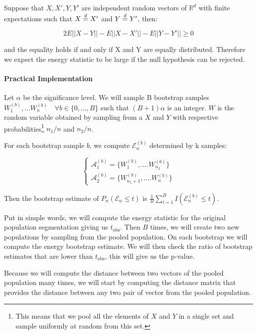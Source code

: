 Suppose that $X,X',Y,Y'$ are independent random vectors of $\mathbb{R}^d$ with finite expectations such that $X \buildrel d \over = X'$ and $Y \buildrel d \over = Y'$, then:

\begin{equation}
	2 E||X-Y||- E||X-X'||- E||Y-Y'|| \ge 0
\end{equation}

and the equality holds if and only if X and Y are equally distributed. Therefore we expect the energy statistic to be large if the null hypothesis can be rejected.

\paragraph{Practical Implementation}
Let $\alpha$ be the significance level. We will sample B bootstrap samples $W_1^{(b)},...W_n^{(b)} \quad \forall b \in \{0,...,B\}$ such that $(B+1)\alpha$ is an integer. $W$ is the random variable obtained by sampling from a $X$ and $Y$ with respective probabilities\footnote{This means that we pool all the elements of $X$ and $Y$ in a single set and sample uniformly at random from this set.} $n_1/n$ and $n_2/n$. 

For each bootstrap sample $b$, we compute $\mathcal{E}_{n}^{(b)}$ determined by k samples:

\begin{equation}
\begin{cases}
	\mathcal{A}_1^{(b)} = \{W_1^{(b)},....W_{n_2}^{(b)}\}\\
	\mathcal{A}_2^{(b)} = \{W_{n_1 + 1}^{(b)},....W_{n}^{(b)}\}
\end{cases}
\end{equation}

Then the bootstrap estimate of $P_n(\mathcal{E}_{n} \le t)$ is $\frac{1}{B} \sum_{i=1}^B I(\mathcal{E}_{n}^{(b)} \le t)$.

Put in simple words, we will compute the energy statistic for the original population segmentation giving us $t_\text{obs}$. Then $B$ times, we will create two new populations by sampling from the pooled population. On each bootstrap we will compute the energy bootstrap estimate. We will then check the ratio of bootstrap estimates that are lower than $t_\text{obs}$, this will give us the p-value. 

Because we will compute the distance between two vectors of the pooled population many times, we will start by computing the distance matrix that provides the distance between any two pair of vector from the pooled population.

